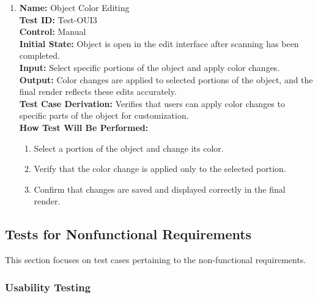 \documentclass[12pt, titlepage]{article}
\begin{document}
\begin{enumerate}
  \item \textbf{Name:} Object Color Editing \label{itm:Test-OUI3} \\
        \textbf{Test ID:} Test-OUI3 \\
        \textbf{Control:} Manual \\
        \textbf{Initial State:} Object is open in the edit interface after scanning has been completed. \\
        \textbf{Input:} Select specific portions of the object and apply color changes. \\
        \textbf{Output:} Color changes are applied to selected portions of the object, and the final render reflects these edits accurately. \\
        \textbf{Test Case Derivation:} Verifies that users can apply color changes to specific parts of the object for customization. \\
        \textbf{How Test Will Be Performed:}
        \begin{enumerate}
          \item Select a portion of the object and change its color.
          \item Verify that the color change is applied only to the selected portion.
          \item Confirm that changes are saved and displayed correctly in the final render.
        \end{enumerate}

\end{enumerate}

\subsection{Tests for Nonfunctional Requirements}
This section focuses on test cases pertaining to the non-functional requirements.

\subsubsection{Usability Testing}
\end{document}
